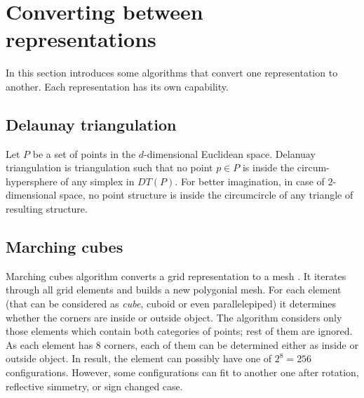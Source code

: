 \section{Converting between representations}

In this section introduces some algorithms that convert one representation to another. Each 
representation has its own capability.

\subsection{Delaunay triangulation}

Let $P$ be a set of points in the $d$-dimensional Euclidean space.
Delanuay triangulation is triangulation such that no point $p \in P$ is inside the circum-hypersphere
of any simplex in $DT(P)$. For better imagination, in case of $2$-dimensional space, no point
structure is inside the circumcircle of any triangle of resulting structure.

\subsection{Marching cubes}
\label{sub:march}

Marching cubes algorithm converts a grid representation to a mesh \cite{Lorensen1987}. It iterates through
all grid elements and builds a new polygonial mesh. For each element (that can be considered as
\emph{cube}, cuboid or even parallelepiped)
it determines whether the corners are inside or outside object. The algorithm considers only those elements
which contain both categories of points; rest of them are ignored. As each element has 8 corners,
each of them can be determined either as inside or outside object. In result, the element can possibly
have one of $2^8 = 256$ configurations. However, some configurations can fit to another one after rotation,
reflective simmetry, or sign changed case.\\


